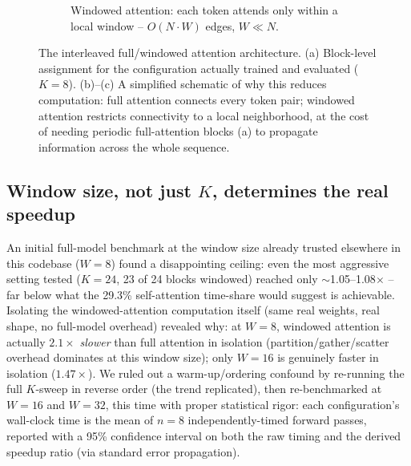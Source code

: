 \documentclass[11pt]{article}
\begin{document}
\begin{figure}[t]
\begin{subfigure}[b]{0.48\textwidth}
        \caption{Windowed attention: each token attends only within a local window -- $O(N{\cdot}W)$
        edges, $W{\ll}N$.}
        \label{fig:attn-windowed}
    \end{subfigure}
    \caption{The interleaved full/windowed attention architecture. (a) Block-level assignment for
    the configuration actually trained and evaluated ($K{=}8$). (b)--(c) A simplified schematic of
    why this reduces computation: full attention connects every token pair; windowed attention
    restricts connectivity to a local neighborhood, at the cost of needing periodic full-attention
    blocks (a) to propagate information across the whole sequence.}
    \label{fig:architecture-diagram}
\end{figure}

\subsection{Window size, not just $K$, determines the real speedup}
\label{sec:window-size}
An initial full-model benchmark at the window size already trusted elsewhere in this codebase
($W=8$) found a disappointing ceiling: even the most aggressive setting tested ($K=24$, 23 of 24
blocks windowed) reached only $\sim$1.05--1.08$\times$ -- far below what the 29.3\%
self-attention time-share would suggest is achievable. Isolating the windowed-attention
computation itself (same real weights, real shape, no full-model overhead) revealed why: at
$W=8$, windowed attention is actually $2.1\times$ \emph{slower} than full attention in isolation
(partition/gather/scatter overhead dominates at this window size); only $W=16$ is genuinely faster
in isolation ($1.47\times$). We ruled out a warm-up/ordering confound by re-running the full
$K$-sweep in reverse order (the trend replicated), then re-benchmarked at $W=16$ and $W=32$, this
time with proper statistical rigor: each configuration's wall-clock time is the mean of $n=8$
independently-timed forward passes, reported with a 95\% confidence interval on both the raw
timing and the derived speedup ratio (via standard error propagation).
\end{document}
